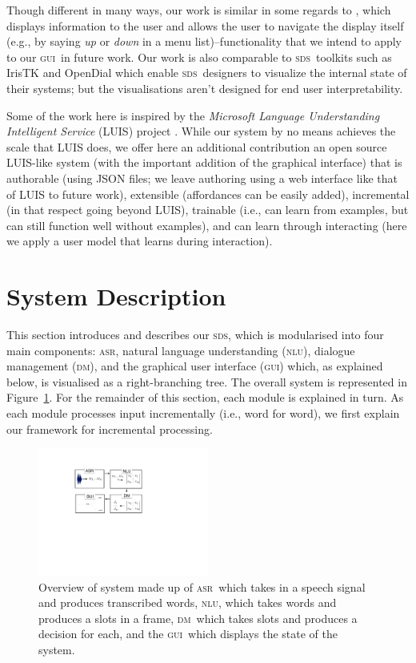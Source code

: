 \documentclass[11pt]{article}
\newcommand{\sds}[0]{\textsc{sds}}
\newcommand{\nlu}[0]{\textsc{nlu}}
\newcommand{\asr}[0]{\textsc{asr}}
\newcommand{\dm}[0]{\textsc{dm}}
\newcommand{\ui}[0]{\textsc{gui}}
\begin{document}
Though different in many ways, our work is similar in some regards to , which displays information to the user and allows the user to navigate the display itself (e.g., by saying \emph{up} or \emph{down} in a menu list)--functionality that we intend to apply to our \ui\ in future work. Our work is also comparable to \sds\ toolkits such as IrisTK \cite{Skantze2012a} and OpenDial \cite{Lison2015a} which enable \sds\ designers to visualize the internal state of their systems; but the visualisations aren't designed for end user interpretability. 

Some of the work here is inspired by the \emph{Microsoft Language Understanding Intelligent Service} (LUIS) project \cite{Williams2015_sigdial}. While our system by no means achieves the scale that LUIS does, we offer here an additional contribution an open source LUIS-like system (with the important addition of the graphical interface) that is authorable (using JSON files; we leave authoring using a web interface like that of LUIS to future work), extensible (affordances can be easily added), incremental (in that respect going beyond LUIS), trainable (i.e., can learn from examples, but can still function well without examples), and can learn through interacting (here we apply a user model that learns during interaction). 

\section{System Description}
\label{section:system_def}

This section introduces and describes our \sds, which is modularised into four main components: \asr, natural language understanding (\nlu), dialogue management (\dm), and the graphical user interface (\ui) which, as explained below, is visualised as a right-branching tree. The overall system is represented in Figure~\ref{fig:overview}. For the remainder of this section, each module is explained in turn. As each module processes input incrementally (i.e., word for word), we first explain our framework for incremental processing.

\begin{figure}[ht]
  \centering
      \includegraphics[width=0.5\textwidth]{figures/sig16-overview.pdf}	
      \caption{Overview of system made up of \asr\ which takes in a speech signal and produces transcribed words, \nlu, which takes words and produces a slots in a frame, \dm\ which takes slots and produces a decision for each, and the \ui\ which displays the state of the system. \label{fig:overview}}
\end{figure}
\end{document}
